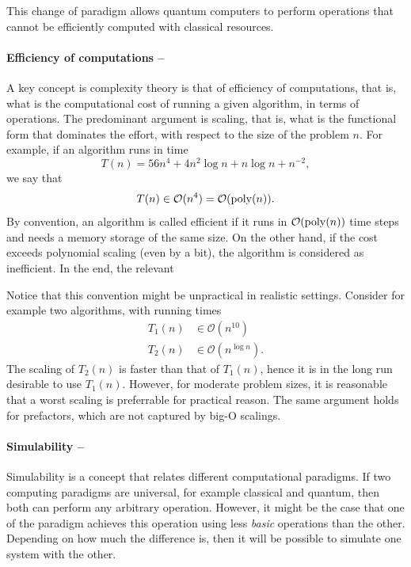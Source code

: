 \documentclass[]{report}
\begin{document}
This change of paradigm allows quantum computers to perform operations that cannot be efficiently computed with classical resources. 

\paragraph{Efficiency of computations --} A key concept is complexity theory is that of efficiency of computations, that is, what is the computational cost of running a given algorithm, in terms of operations. The predominant argument is scaling, that is, what is the functional form that dominates the effort, with respect to the size of the problem $n$. For example, if an algorithm runs in time
\begin{equation}
T(n) = 56 n^4 + 4n^2 \log n + n \log n + n^{-2}, 
\end{equation}
we say that 
\begin{equation}
T(n) \in \mathcal O(n^4) = \mathcal O({\rm poly}(n)).
\end{equation}
By convention, an algorithm is called efficient if it runs in $\mathcal O({\rm poly}(n))$ time steps and needs a memory storage of the same size. On the other hand, if the cost exceeds polynomial scaling (even by a bit), the algorithm is considered as inefficient. In the end, the relevant 

Notice that this convention might be unpractical in realistic settings. Consider for example two algorithms, with running times
\begin{align}
T_1(n) & \in \mathcal O(n^{10}) \\
T_2(n) & \in \mathcal O(n^{\log n}).
\end{align}
The scaling of $T_2(n)$ is faster than that of $T_1(n)$, hence it is in the long run desirable to use $T_1(n)$. However, for moderate problem sizes, it is reasonable that a worst scaling is preferrable for practical reason. The same argument holds for prefactors, which are not captured by big-O scalings. 

\paragraph{Simulability --} Simulability is a concept that relates different computational paradigms. If two computing paradigms are universal, for example classical and quantum, then both can perform any arbitrary operation. However, it might be the case that one of the paradigm achieves this operation using less \textit{basic} operations than the other. Depending on how much the difference is, then it will be possible to simulate one system with the other. 
\end{document}
